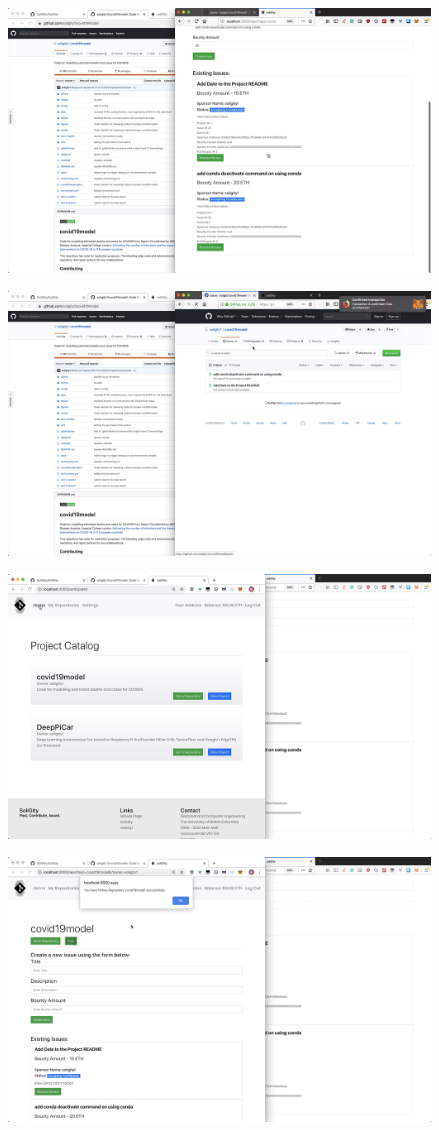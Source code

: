 \documentclass[12pt]{article}
\renewcommand{\_}{\kern-1.5pt\textunderscore\kern-1.5pt}
\begin{document}
\includegraphics[height=7cm]{graphs/28. soligity_issues}

\includegraphics[height=7cm]{graphs/29. github_issues}

\includegraphics[height=7cm]{graphs/30. project_catalog_bob_view}

\includegraphics[height=7cm]{graphs/31. bob_fork_project}
\end{document}
